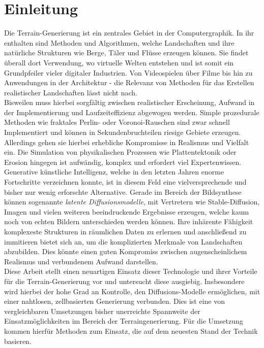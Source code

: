 \chapter{Einleitung}



Die Terrain-Generierung ist ein zentrales Gebiet in der Computergraphik. In ihr enthalten sind Methoden und Algorithmen, welche Landschaften und ihre natürliche Strukturen wie Berge, Täler und Flüsse erzeugen können. Sie findet überall dort Verwendung, wo virtuelle Welten entstehen und ist somit ein Grundpfeiler vieler digitaler Industrien. Von Videospielen über Filme bis hin zu Anwendungen in der Architektur - die Relevanz von Methoden für das Erstellen realistischer Landschaften lässt nicht nach. \\
Bisweilen muss hierbei sorgfältig zwischen realistischer Erscheinung, Aufwand in der Implementierung und Laufzeiteffizienz abgewogen werden. Simple prozedurale Methoden wie fraktales Perlin- oder Voronoi-Rauschen sind zwar schnell Implementiert und können in Sekundenbruchteilen riesige Gebiete erzeugen. Allerdings gehen sie hierbei erhebliche Kompromisse in Realismus und Vielfalt ein. Die Simulation von physikalischen Prozessen wie Plattentektonik oder Erosion hingegen ist aufwändig, komplex und erfordert viel Expertenwissen. \\
Generative künstliche Intelligenz, welche in den letzten Jahren enorme Fortschritte verzeichnen konnte, ist in diesem Feld eine vielversprechende und bisher nur wenig erforschte Alternative. Gerade im Bereich der Bildsynthese können sogenannte \textit{latente Diffusionsmodelle}, mit Vertretern wie Stable-Diffusion, Imagen und vielen weiteren beeindruckende Ergebnisse erzeugen, welche kaum noch von echten Bildern unterschieden werden können.
Ihre inhärente Fähigkeit komplexeste Strukturen in räumlichen Daten zu erlernen und anschließend zu immitieren bietet sich an, um die komplizierten Merkmale von Landschaften abzubilden. Dies könnte einen guten Kompromiss zwischen augenscheinlichem Realismus und verbundenem Aufwand darstellen. \\
Diese Arbeit stellt einen neuartigen Einsatz dieser Technologie und ihrer Vorteile für die Terrain-Generierung vor und untersucht diese ausgiebig. Insbesondere wird hierbei der hohe Grad an Kontrolle, den Diffusions-Modelle ermöglichen, mit einer nahtlosen, zellbasierten Generierung verbunden. Dies ist eine von vergleichbaren Umsetzungen bisher unerreichte Spannweite der Einsatzmöglichkeiten im Bereich der Terraingenerierung. Für die Umsetzung kommen hierfür Methoden zum Einsatz, die auf dem neuesten Stand der Technik basieren.
 
